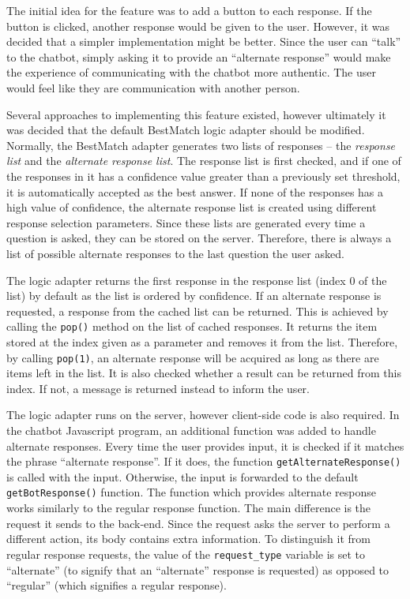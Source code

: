 \documentclass[12pt,a4paper]{article}
\begin{document}
The initial idea for the feature was to add a button to each response. If the button is clicked, another response would be given to the user. However, it was decided that a simpler implementation might be better. Since the user can “talk” to the chatbot, simply asking it to provide an “alternate response” would make the experience of communicating with the chatbot more authentic. The user would feel like they are communication with another person.

Several approaches to implementing this feature existed, however ultimately it was decided that the default BestMatch logic adapter should be modified. Normally, the BestMatch adapter generates two lists of responses – the \textit{response list} and the \textit{alternate response list}. The response list is first checked, and if one of the responses in it has a confidence value greater than a previously set threshold, it is automatically accepted as the best answer. If none of the responses has a high value of confidence, the alternate response list is created using different response selection parameters. Since these lists are generated every time a question is asked, they can be stored on the server. Therefore, there is always a list of possible alternate responses to the last question the user asked. 

The logic adapter returns the first response in the response list (index 0 of the list) by default as the list is ordered by confidence. If an alternate response is requested, a response from the cached list can be returned. This is achieved by calling the \texttt{pop()} method on the list of cached responses. It returns the item stored at the index given as a parameter and removes it from the list. Therefore, by calling \texttt{pop(1)}, an alternate response will be acquired as long as there are items left in the list. It is also checked whether a result can be returned from this index. If not, a message is returned instead to inform the user.

The logic adapter runs on the server, however client-side code is also required. In the chatbot Javascript program, an additional function was added to handle alternate responses. Every time the user provides input, it is checked if it matches the phrase “alternate response”. If it does, the function \texttt{getAlternateResponse()} is called with the input. Otherwise, the input is forwarded to the default \texttt{getBotResponse()} function. The function which provides alternate response works similarly to the regular response function. The main difference is the request it sends to the back-end. Since the request asks the server to perform a different action, its body contains extra information. To distinguish it from regular response requests, the value of the \texttt{request\_type} variable is set to “alternate” (to signify that an “alternate” response is requested) as opposed to “regular” (which signifies a regular response). 
\end{document}
